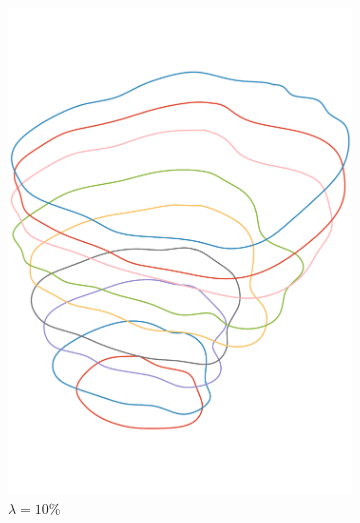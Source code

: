 \documentclass[article]{memoir}
\begin{document}
\begin{figure}[htbp]
\begin{subfigure}{0.32\textwidth}
        \includegraphics[width=\linewidth]{../images/curves_lambda_10_cropped.pdf}
        \caption{\( \lambda = 10 \% \)}
    \end{subfigure}
    \begin{subfigure}{0.32\textwidth}

\end{subfigure}
\end{figure}
\end{document}
